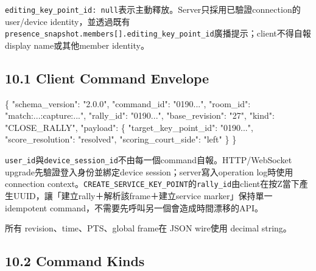 \documentclass[
  9pt,
  a4paper,
]{article}
\newenvironment{Shaded}{}{}
\newcommand{\DataTypeTok}[1]{\textcolor[rgb]{0.56,0.13,0.00}{#1}}
\newcommand{\FunctionTok}[1]{\textcolor[rgb]{0.02,0.16,0.49}{#1}}
\newcommand{\StringTok}[1]{\textcolor[rgb]{0.25,0.44,0.63}{#1}}
\begin{document}
\texttt{editing\_\allowbreak{}key\_\allowbreak{}point\_\allowbreak{}id:
null}表示主動釋放。Server只採用已驗證connection的user/device identity，並透過既有
\texttt{presence\_\allowbreak{}snapshot.members{[}{]}.editing\_\allowbreak{}key\_\allowbreak{}point\_\allowbreak{}id}廣播提示；client不得自報display
name或其他member identity。

\subsection{10.1 Client Command
Envelope}\label{101-client-command-envelope}

\begin{Shaded}
\begin{Highlighting}[]
\FunctionTok{\{}
  \DataTypeTok{"schema\_\allowbreak{}version"}\FunctionTok{:} \StringTok{"2.0.0"}\FunctionTok{,}
  \DataTypeTok{"command\_\allowbreak{}id"}\FunctionTok{:} \StringTok{"0190..."}\FunctionTok{,}
  \DataTypeTok{"room\_\allowbreak{}id"}\FunctionTok{:} \StringTok{"match:...:capture:..."}\FunctionTok{,}
  \DataTypeTok{"rally\_\allowbreak{}id"}\FunctionTok{:} \StringTok{"0190..."}\FunctionTok{,}
  \DataTypeTok{"base\_\allowbreak{}revision"}\FunctionTok{:} \StringTok{"27"}\FunctionTok{,}
  \DataTypeTok{"kind"}\FunctionTok{:} \StringTok{"CLOSE\_\allowbreak{}RALLY"}\FunctionTok{,}
  \DataTypeTok{"payload"}\FunctionTok{:} \FunctionTok{\{}
    \DataTypeTok{"target\_\allowbreak{}key\_\allowbreak{}point\_\allowbreak{}id"}\FunctionTok{:} \StringTok{"0190..."}\FunctionTok{,}
    \DataTypeTok{"score\_\allowbreak{}resolution"}\FunctionTok{:} \StringTok{"resolved"}\FunctionTok{,}
    \DataTypeTok{"scoring\_\allowbreak{}court\_\allowbreak{}side"}\FunctionTok{:} \StringTok{"left"}
  \FunctionTok{\}}
\FunctionTok{\}}
\end{Highlighting}
\end{Shaded}

\texttt{user\_\allowbreak{}id}與\texttt{device\_\allowbreak{}session\_\allowbreak{}id}不由每一個command自報。HTTP/WebSocket
upgrade先驗證登入身份並綁定device session；server寫入operation
log時使用connection
context。\texttt{CREATE\_\allowbreak{}SERVICE\_\allowbreak{}KEY\_\allowbreak{}POINT}的\texttt{rally\_\allowbreak{}id}由client在按Z當下產生UUID，讓「建立rally＋解析該frame＋建立service
marker」保持單一idempotent
command，不需要先呼叫另一個會造成時間漂移的API。

所有 revision、time、PTS、global frame在 JSON wire使用 decimal string。

\subsection{10.2 Command Kinds}\label{102-command-kinds}
\end{document}
